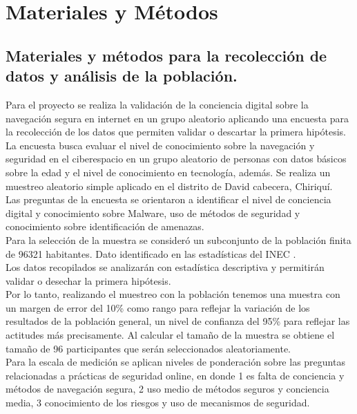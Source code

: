 \chapter{Materiales y Métodos}\label{cap:capitulo_3}
\section{Materiales y métodos para la recolección de datos y análisis de la población.}\label{section:Materiales y métodos para la recolección de datos y análisis de la población } 
Para el proyecto se realiza la validación de la conciencia digital sobre la navegación segura en internet en un grupo aleatorio aplicando una encuesta para la recolección de los datos que permiten validar o descartar la primera hipótesis. La encuesta busca evaluar el nivel de conocimiento sobre la navegación y seguridad en el ciberespacio en un grupo aleatorio de personas con datos básicos sobre la edad y el nivel de conocimiento en tecnología, además. Se realiza un muestreo aleatorio simple aplicado en el distrito de David cabecera, Chiriquí. \\
Las preguntas de la encuesta se orientaron a identificar el nivel de conciencia digital y conocimiento sobre  Malware, uso de métodos de seguridad y conocimiento sobre identificación de amenazas. \\
Para la selección de la muestra se consideró un subconjunto de la población finita de 96321 habitantes. Dato identificado en las estadísticas del INEC \cite{INEC}. \\
Los datos recopilados se analizarán con estadística descriptiva y permitirán validar o desechar la primera hipótesis. \\
Por lo tanto, realizando el muestreo con la población tenemos una muestra con un margen de error del 10\% como rango para reflejar la variación de los resultados de la población general, un nivel de confianza del 95\% para reflejar las actitudes más precisamente. Al calcular el tamaño de la muestra se obtiene el tamaño de 96 participantes que serán seleccionados aleatoriamente. \\
Para la escala de medición se aplican niveles de ponderación sobre las preguntas relacionadas a prácticas de seguridad online, en donde 1 es falta de conciencia y métodos de navegación segura, 2 uso medio de métodos seguros y conciencia media, 3 conocimiento de los riesgos y uso de mecanismos de seguridad.
